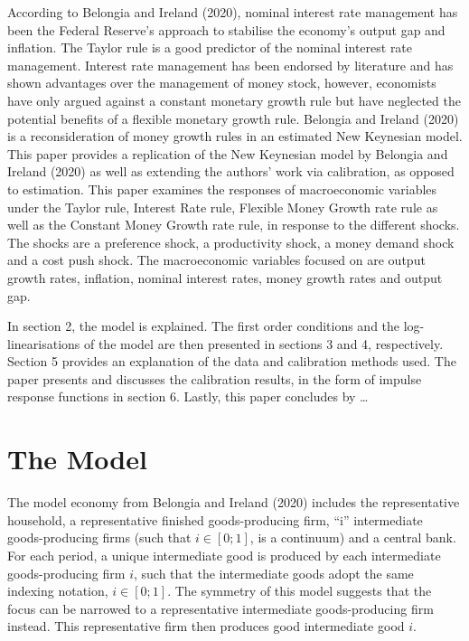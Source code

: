 \documentclass[11pt,preprint, authoryear]{elsarticle}
\numberwithin{equation}{section}
\numberwithin{figure}{section}
\numberwithin{table}{section}
\begin{document}
According to Belongia and Ireland (2020), nominal interest rate
management has been the Federal Reserve's approach to stabilise the
economy's output gap and inflation. The Taylor rule is a good predictor
of the nominal interest rate management. Interest rate management has
been endorsed by literature and has shown advantages over the management
of money stock, however, economists have only argued against a constant
monetary growth rule but have neglected the potential benefits of a
flexible monetary growth rule. Belongia and Ireland (2020) is a
reconsideration of money growth rules in an estimated New Keynesian
model. This paper provides a replication of the New Keynesian model by
Belongia and Ireland (2020) as well as extending the authors' work via
calibration, as opposed to estimation. This paper examines the responses
of macroeconomic variables under the Taylor rule, Interest Rate rule,
Flexible Money Growth rate rule as well as the Constant Money Growth
rate rule, in response to the different shocks. The shocks are a
preference shock, a productivity shock, a money demand shock and a cost
push shock. The macroeconomic variables focused on are output growth
rates, inflation, nominal interest rates, money growth rates and output
gap.

In section 2, the model is explained. The first order conditions and the
log-linearisations of the model are then presented in sections 3 and 4,
respectively. Section 5 provides an explanation of the data and
calibration methods used. The paper presents and discusses the
calibration results, in the form of impulse response functions in
section 6. Lastly, this paper concludes by \ldots{}

\hypertarget{the-model}{%
\section{The Model}\label{the-model}}

The model economy from Belongia and Ireland (2020) includes the
representative household, a representative finished goods-producing
firm, ``i'' intermediate goods-producing firms (such that
\(i \in [0; 1]\), is a continuum) and a central bank. For each period, a
unique intermediate good is produced by each intermediate
goods-producing firm \(i\), such that the intermediate goods adopt the
same indexing notation, \(i \in [0; 1]\). The symmetry of this model
suggests that the focus can be narrowed to a representative intermediate
goods-producing firm instead. This representative firm then produces
good intermediate good \(i\).
\end{document}
